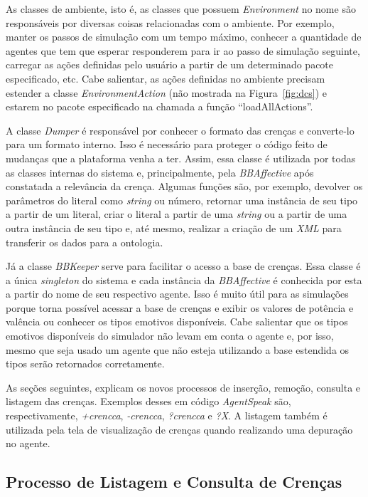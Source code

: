As classes de ambiente, isto é, as classes que possuem \emph{Environment} no
nome são responsáveis por diversas coisas relacionadas com o ambiente. Por
exemplo, manter os passos de simulação com um tempo máximo, conhecer a
quantidade de agentes que tem que esperar responderem para ir ao passo de
simulação seguinte, carregar as ações definidas pelo usuário a partir de um
determinado pacote especificado, etc. Cabe salientar, as ações definidas no
ambiente precisam estender a classe \emph{EnvironmentAction} (não mostrada na
Figura~\ref{fig:dcs}) e
estarem no pacote especificado na chamada a função ``loadAllActions''.

A classe \emph{Dumper} é responsável por conhecer o formato das crenças \jason
e converte-lo para um formato interno. Isso é necessário para proteger o
código feito de mudanças que a plataforma venha a ter. Assim, essa classe é
utilizada por todas as classes internas do sistema e, principalmente, pela
\emph{BBAffective} após constatada a relevância da crença. Algumas funções
são, por exemplo, devolver os parâmetros do literal como \emph{string} ou número,
retornar uma instância de seu tipo a partir de um literal, criar o literal a
partir de uma \emph{string} ou a partir de uma outra instância de seu tipo e,
até mesmo, realizar a criação de um \emph{XML} para transferir os dados para
a ontologia.

Já a classe \emph{BBKeeper} serve para facilitar o acesso a base de crenças.
Essa classe é a única \emph{singleton} do sistema e cada instância da
\emph{BBAffective} é conhecida por esta a partir do nome de seu respectivo
agente. Isso é muito útil para as simulações porque torna possível acessar a
base de crenças e exibir os valores de potência e valência ou conhecer os
tipos emotivos disponíveis. Cabe salientar que os tipos emotivos disponíveis
do simulador não levam em conta o agente e, por isso, mesmo que seja usado um
agente que não esteja utilizando a base estendida os tipos serão retornados
corretamente.

As seções seguintes, explicam os novos processos de inserção, remoção,
consulta e listagem das crenças. Exemplos desses em código \emph{AgentSpeak}
são, respectivamente, \emph{+crencca}, \emph{-crencca}, \emph{?crencca} e
\emph{?X}. A listagem também é utilizada pela tela de visualização de
crenças quando realizando uma depuração no agente.

\subsection{Processo de Listagem e Consulta de Crenças}

